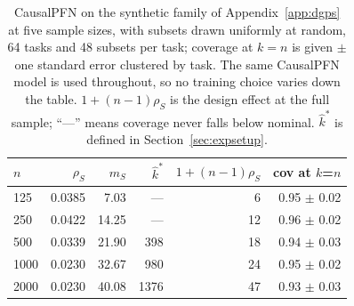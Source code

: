 \begin{table}[tp]
\centering
\footnotesize
\setlength{\tabcolsep}{4pt}
\begin{tabular}{lrrrrr}
\toprule
\textbf{$n$} & \textbf{$\rho_S$} & \textbf{$m_S$} & \textbf{$\hat k^*$} & \textbf{$1+(n-1)\rho_S$} & \textbf{cov at $k$=$n$} \\
\midrule
125 & 0.0385 & 7.03 & --- & 6 & 0.95 $\pm$ 0.02 \\
250 & 0.0422 & 14.25 & --- & 12 & 0.96 $\pm$ 0.02 \\
500 & 0.0339 & 21.90 & 398 & 18 & 0.94 $\pm$ 0.03 \\
1000 & 0.0230 & 32.67 & 980 & 24 & 0.95 $\pm$ 0.02 \\
2000 & 0.0230 & 40.08 & 1376 & 47 & 0.93 $\pm$ 0.03 \\
\bottomrule
\end{tabular}
\caption{CausalPFN on the synthetic family of Appendix~\ref{app:dgps} at five sample sizes, with subsets drawn uniformly at random, 64 tasks and 48 subsets per task; coverage at $k=n$ is given $\pm$ one standard error clustered by task. The same CausalPFN model is used throughout, so no training choice varies down the table. $1+(n-1)\rho_S$ is the design effect at the full sample; ``---'' means coverage never falls below nominal. $\hat k^*$ is defined in Section~\ref{sec:expsetup}.}
\label{tab:nsweep}
\end{table}
